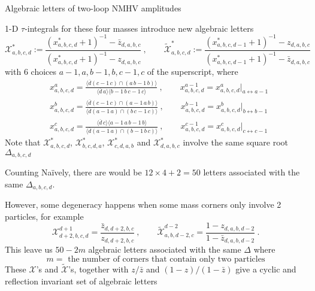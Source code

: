 \documentclass[10pt]{beamer}
\begin{document}
\begin{frame}{Algebraic letters of two-loop NMHV amplitudes}

\footnotesize{
  1-D $\tau$-integrals for these four masses introduce new algebraic letters
  \begin{equation*}
    \mathcal{X}_{a,b,c,d}^{\ast}:=\frac{(x^{\ast}_{a,b,c,d}+1)^{-1}-\bar{z}_{d,a,b,c}}{(x^{\ast}_{a,b,c,d}+1)^{-1}-z_{d,a,b,c}}\:, \qquad     
    \widetilde{\mathcal{X}}_{a,b,c,d}^{\ast}:=\frac{(x^{\ast}_{a,b,c,d-1}+1)^{-1}-z
    _{d,a,b,c}}{(x^{\ast}_{a,b,c,d-1}+1)^{-1}-\bar{z}_{d,a,b,c}}
\end{equation*}
with 6 choices $a{-}1,a,b{-}1,b,c{-}1,c$ of the superscript, where
\begin{align*}
    & x^{a}_{a,b,c,d}=\frac{\langle\overline{d} (c{-}1\,c)\cap(a\,b{-}1\,b) \rangle}{\langle \overline{d}\,a\rangle \langle b{-}1\,b\,c{-}1\,c\rangle} \:, \qquad x^{a-1}_{a,b,c,d}= x^{a}_{a,b,c,d}\vert_{a\leftrightarrow a{-}1}\\
    &x_{a,b,c,d}^{b}=\frac{\langle \overline{d} (c{-}1\,c)\cap (a{-}1\,a\,b)\rangle}{\langle \overline{d} (a{-}1\,a)\cap(b\,c{-}1\,c)\rangle} \:, \qquad x^{b-1}_{a,b,c,d}= x^{b}_{a,b,c,d}\vert_{b\leftrightarrow b{-}1} \\
    &x_{a,b,c,d}^{c}=\frac{\langle \overline{d}\,c\rangle\langle a{-}1\,a\,b{-}1\,b\rangle}{\langle \overline{d}(a{-}1\,a)\cap(b{-}1\,b\,c)\rangle} \:, \qquad x^{c-1}_{a,b,c,d}= x^{c}_{a,b,c,d}\vert_{c\leftrightarrow c{-}1}  \nonumber  
\end{align*}
Note that $\mathcal{X}_{a,b,c,d}^{\ast}$, $\mathcal{X}_{b,c,d,a}^{\ast}$, $\mathcal{X}_{c,d,a,b}^{\ast}$ and $\mathcal{X}_{d,a,b,c}^{\ast}$ involve the same square root $\Delta_{a,b,c,d}$

}

\end{frame}

\begin{frame}{Counting}
  Na\"{i}vely, there are would be $12\times 4 +2 =50$ letters associated with the same $\Delta_{a,b,c,d}$. 

  However, some degeneracy happens when some mass corners only involve 2 particles, for example
  \[
    \mathcal{X}_{d+2,b,c,d}^{d+1}=\frac{\bar{z}_{d,d+2,b,c}}{z_{d,d+2,b,c}}\:,\qquad 
    \widetilde{\mathcal{X}}_{a,b,d-2,c}^{d-2}=\frac{1-z_{d,a,b,d-2}}{1-\bar{z}_{d,a,b,d-2}} \:.
  \]
  This leave us $50-2m$ algebraic letters associated with the same $\Delta$ where 
  \[
  m= \text{ the number of corners that contain only two particles}
  \]
  These $\mathcal{X}$'s and $\widetilde{\mathcal{X}}$'s, together with $z/\bar{z}$ and $(1-z)/(1-\bar{z})$ give a cyclic and reflection invariant set of algebraic letters %
  
\end{frame}
\end{document}
